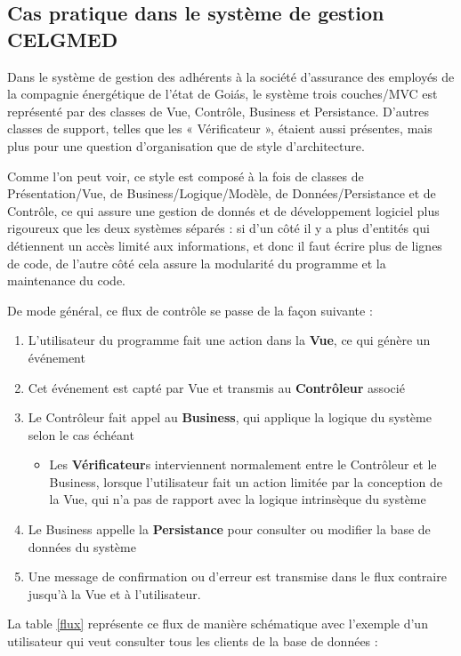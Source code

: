 \subsection{Cas pratique dans le système de gestion CELGMED}

Dans le système de gestion des adhérents à la société d'assurance des employés de la compagnie énergétique de l'état de Goiás, le système trois couches/MVC est représenté par des classes de Vue, Contrôle, Business et Persistance. D'autres classes de support, telles que les  « Vérificateur », étaient aussi présentes, mais plus pour une question d'organisation que de  style d'architecture.

Comme l'on peut voir, ce style est composé à la fois de classes de Présentation/Vue, de Business/Logique/Modèle, de Données/Persistance et de Contrôle, ce qui assure une gestion de donnés et de développement logiciel plus rigoureux que les deux systèmes séparés : si d'un côté il y a plus d'entités qui détiennent un accès limité aux informations, et donc il faut écrire plus de lignes de code, de l'autre côté cela assure la modularité du programme et la maintenance du code.

De mode général, ce flux de contrôle se passe de la façon suivante :

\begin{enumerate}
\item L'utilisateur du programme fait une action dans la \textbf{Vue}, ce qui génère un événement
\item Cet événement est capté par Vue et transmis au \textbf{Contrôleur} associé
\item Le Contrôleur fait appel au \textbf{Business}, qui applique la logique du système selon le cas échéant
\begin{itemize}
\item Les \textbf{Vérificateur}s interviennent normalement entre le Contrôleur et le Business, lorsque l'utilisateur fait un action limitée par la conception de la Vue, qui n'a pas de rapport avec la logique intrinsèque du système
\end{itemize}
\item Le Business appelle la \textbf{Persistance} pour consulter ou modifier la base de données du système
\item Une message de confirmation ou d'erreur est transmise dans le flux contraire jusqu'à la Vue et à l'utilisateur.
\end{enumerate}

La table \ref{flux} représente ce flux de manière schématique avec l'exemple d'un utilisateur qui veut consulter tous les clients de la base de données :

